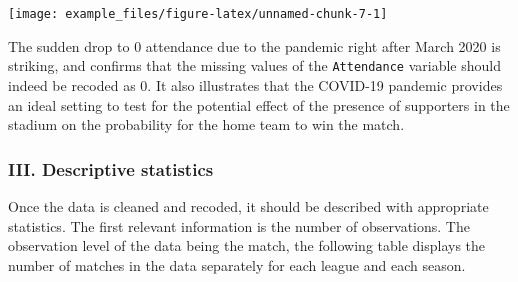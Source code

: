 \documentclass[
]{article}
\newenvironment{Shaded}{\begin{snugshade}}{\end{snugshade}}
\newcommand{\CommentTok}[1]{\textcolor[rgb]{0.56,0.35,0.01}{\textit{#1}}}
\newcommand{\DataTypeTok}[1]{\textcolor[rgb]{0.13,0.29,0.53}{#1}}
\newcommand{\DecValTok}[1]{\textcolor[rgb]{0.00,0.00,0.81}{#1}}
\newcommand{\KeywordTok}[1]{\textcolor[rgb]{0.13,0.29,0.53}{\textbf{#1}}}
\newcommand{\NormalTok}[1]{#1}
\newcommand{\OperatorTok}[1]{\textcolor[rgb]{0.81,0.36,0.00}{\textbf{#1}}}
\newcommand{\StringTok}[1]{\textcolor[rgb]{0.31,0.60,0.02}{#1}}
\begin{document}
\begin{center}\texttt{[image: example\_files/figure-latex/unnamed-chunk-7-1]} \end{center}

The sudden drop to 0 attendance due to the pandemic right after March
2020 is striking, and confirms that the missing values of the
\texttt{Attendance} variable should indeed be recoded as 0. It also
illustrates that the COVID-19 pandemic provides an ideal setting to test
for the potential effect of the presence of supporters in the stadium on
the probability for the home team to win the match.

\begin{Shaded}
\end{Shaded}

\hypertarget{iii.-descriptive-statistics}{%
\subsubsection{III. Descriptive
statistics}\label{iii.-descriptive-statistics}}

Once the data is cleaned and recoded, it should be described with
appropriate statistics. The first relevant information is the number of
observations. The observation level of the data being the match, the
following table displays the number of matches in the data separately
for each league and each season.
\end{document}

